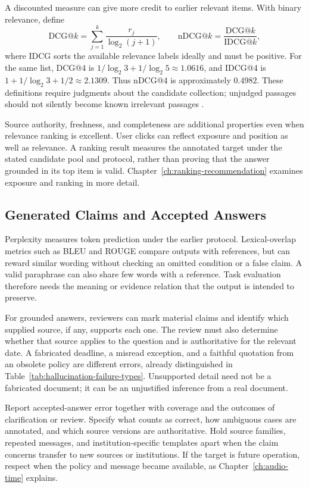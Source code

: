A discounted measure can give more credit to earlier relevant items. With binary relevance, define
\[
 \mathrm{DCG@}k=\sum_{j=1}^{k}\frac{r_j}{\log_2(j+1)},\qquad
 \mathrm{nDCG@}k=\frac{\mathrm{DCG@}k}{\mathrm{IDCG@}k},
\]
where IDCG sorts the available relevance labels ideally and must be positive. For the same list, DCG@4 is $1/\log_2 3+1/\log_2 5\approx1.0616$, and IDCG@4 is $1+1/\log_2 3+1/2\approx2.1309$. Thus nDCG@4 is approximately $0.4982$. These definitions require judgments about the candidate collection; unjudged passages should not silently become known irrelevant passages \citep{manning2008}.

Source authority, freshness, and completeness are additional properties even when relevance ranking is excellent. User clicks can reflect exposure and position as well as relevance. A ranking result measures the annotated target under the stated candidate pool and protocol, rather than proving that the answer grounded in its top item is valid. Chapter~\ref{ch:ranking-recommendation} examines exposure and ranking in more detail.

\subsection{Generated Claims and Accepted Answers}

Perplexity measures token prediction under the earlier protocol. Lexical-overlap metrics such as BLEU and ROUGE compare outputs with references, but can reward similar wording without checking an omitted condition or a false claim. A valid paraphrase can also share few words with a reference. Task evaluation therefore needs the meaning or evidence relation that the output is intended to preserve.

For grounded answers, reviewers can mark material claims and identify which supplied source, if any, supports each one. The review must also determine whether that source applies to the question and is authoritative for the relevant date. A fabricated deadline, a misread exception, and a faithful quotation from an obsolete policy are different errors, already distinguished in Table~\ref{tab:hallucination-failure-types}. Unsupported detail need not be a fabricated document; it can be an unjustified inference from a real document.

Report accepted-answer error together with coverage and the outcomes of clarification or review. Specify what counts as correct, how ambiguous cases are annotated, and which source versions are authoritative. Hold source families, repeated messages, and institution-specific templates apart when the claim concerns transfer to new sources or institutions. If the target is future operation, respect when the policy and message became available, as Chapter~\ref{ch:audio-time} explains.

